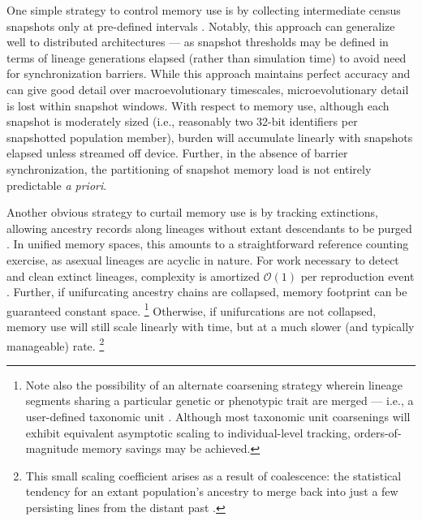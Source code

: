 One simple strategy to control memory use is by collecting intermediate census snapshots only at pre-defined intervals \citep{TODOcliff}.
Notably, this approach can generalize well to distributed architectures --- as snapshot thresholds may be defined in terms of lineage generations elapsed (rather than simulation time) to avoid need for synchronization barriers.
While this approach maintains perfect accuracy and can give good detail over macroevolutionary timescales, microevolutionary detail is lost within snapshot windows.
With respect to memory use, although each snapshot is moderately sized (i.e., reasonably two 32-bit identifiers per snapshotted population member), burden will accumulate linearly with snapshots elapsed unless streamed off device.
Further, in the absence of barrier synchronization, the partitioning of snapshot memory load is not entirely predictable \textit{a priori}.

Another obvious strategy to curtail memory use is by tracking extinctions, allowing ancestry records along lineages without extant descendants to be purged \citep{dolson2024phylotrackpy}.
In unified memory spaces, this amounts to a straightforward reference counting exercise, as asexual lineages are acyclic in nature.
For work necessary to detect and clean extinct lineages, complexity is amortized $\mathcal{O}(1)$ per reproduction event \citep{TODO}.
Further, if unifurcating ancestry chains are collapsed, memory footprint can be guaranteed constant space.
\unskip\footnote{%
Note also the possibility of an alternate coarsening strategy wherein lineage segments sharing a particular genetic or phenotypic trait are merged --- i.e., a user-defined taxonomic unit \citep{dolson2024phylotrackpy}.
Although most taxonomic unit coarsenings will exhibit equivalent asymptotic scaling to individual-level tracking, orders-of-magnitude memory savings may be achieved.
}
Otherwise, if unifurcations are not collapsed, memory use will still scale linearly with time, but at a much slower (and typically manageable) rate.
\unskip\footnote{%
This small scaling coefficient arises as a result of coalescence: the statistical tendency for an extant population's ancestry to merge back into just a few persisting lines from the distant past \citep{TODO}.
}

